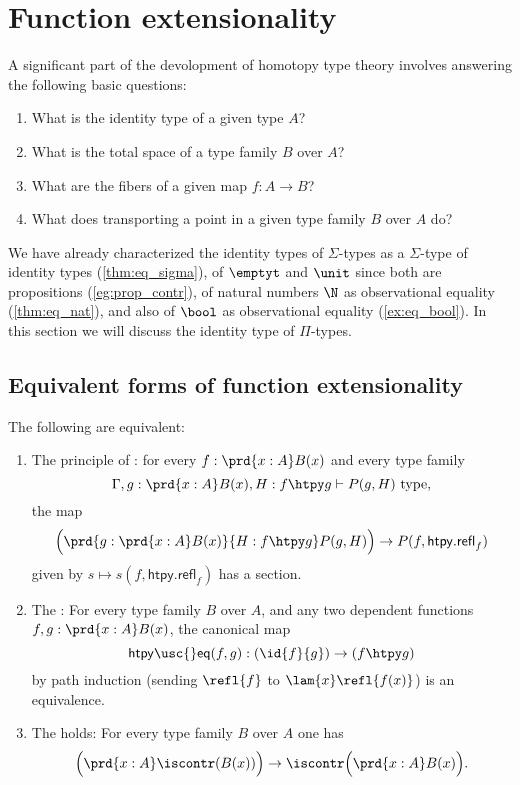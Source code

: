 \chapter{Function extensionality}

A significant part of the devolopment of homotopy type theory involves answering the following basic questions:
\begin{enumerate}
\item What is the identity type of a given type $A$?
\item What is the total space of a type family $B$ over $A$?
\item What are the fibers of a given map $f:A\to B$?
\item What does transporting a point in a given type family $B$ over $A$ do?
\end{enumerate}
We have already characterized the identity types of $\Sigma$-types as a $\Sigma$-type of identity types (\cref{thm:eq_sigma}), of $\emptyt$ and $\unit$ since both are propositions (\cref{eg:prop_contr}), of natural numbers $\N$ as observational equality (\cref{thm:eq_nat}), and also of $\bool$ as observational equality (\cref{ex:eq_bool}). In this section we will discuss the identity type of $\Pi$-types.

\section{Equivalent forms of function extensionality}
\begin{thm}\label{thm:funext_wkfunext}
The following are equivalent:
\begin{enumerate}
\item The principle of : for every $f:\prd{x:A}B(x)$ and every type family
\begin{equation*}
\Gamma,g:\prd{x:A}B(x), H:f\htpy g \vdash P(g,H)~\mathrm{type},
\end{equation*}
the map
\begin{equation*}
\Big(\prd{g:\prd{x:A}B(x)}{H:f\htpy g}P(g,H)\Big)\to P(f,\mathsf{htpy.refl}_f)
\end{equation*}
given by $s\mapsto s(f,\mathsf{htpy.refl}_f)$ has a section.
\item The : For every type family $B$ over $A$, and any two dependent functions $f,g:\prd{x:A}B(x)$, the canonical map
\begin{equation*}
\mathsf{htpy\usc{}eq}(f,g) : (\id{f}{g})\to (f\htpy g)
\end{equation*}
by path induction (sending $\refl{f}$ to $\lam{x}\refl{f(x)}$) is an equivalence.
\item The  holds: For every type family $B$ over $A$ one has
\begin{equation*}
\Big(\prd{x:A}\iscontr(B(x))\Big)\to\iscontr\Big(\prd{x:A}B(x)\Big).
\end{equation*}
\end{enumerate}
\end{thm}

